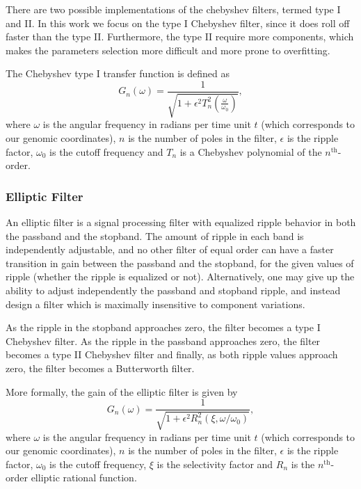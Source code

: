 There are two possible implementations of the chebyshev filters, termed type I and II. In this work we focus on the type I Chebyshev filter, since it does roll off faster than the type II. Furthermore, the type II require more components, which makes the parameters selection more difficult and more prone to overfitting.

The Chebyshev type I transfer function is defined as
\begin{equation}
  \label{eq:chebyshev1}
  G_n(\omega) = \frac{1}{\sqrt{1+{\epsilon^2 {T}_{n}^{2} (\frac{\omega}{\omega_0})}}},
\end{equation}
where $ \omega $ is the angular frequency in radians per time unit $ t $ (which corresponds to our genomic coordinates), $n$ is the number of poles in the filter, $ \epsilon $ is the ripple factor, $ \omega_0 $ is the cutoff frequency and $ T_n $ is a Chebyshev polynomial of the $n^{\text{th}}$-order.

\subsubsection{Elliptic Filter}
\label{sec:elliptic.filter}

An elliptic filter is a signal processing filter with equalized ripple behavior in both the passband and the stopband. The amount of ripple in each band is independently adjustable, and no other filter of equal order can have a faster transition in gain between the passband and the stopband, for the given values of ripple (whether the ripple is equalized or not). Alternatively, one may give up the ability to adjust independently the passband and stopband ripple, and instead design a filter which is maximally insensitive to component variations.

As the ripple in the stopband approaches zero, the filter becomes a type I Chebyshev filter. As the ripple in the passband approaches zero, the filter becomes a type II Chebyshev filter and finally, as both ripple values approach zero, the filter becomes a Butterworth filter.

More formally, the gain of the elliptic filter is given by
\begin{equation}
  \label{eq:elliptic1}
  G_n(\omega)=\frac{1}{\sqrt{1+{ \epsilon^2 R_n^2(\xi,\omega/\omega_0)}}},
\end{equation}
where $ \omega $ is the angular frequency in radians per time unit $ t $ (which corresponds to our genomic coordinates), $n$ is the number of poles in the filter, $ \epsilon $ is the ripple factor, $ \omega_0 $ is the cutoff frequency, $ \xi $ is the selectivity factor and $ R_n $ is the $n^{\text{th}}$-order elliptic rational function.


